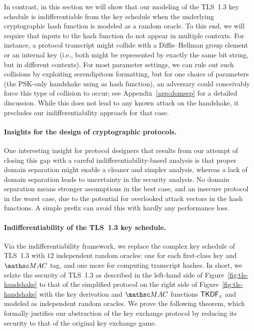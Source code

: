 In contrast, in this section we will show that our modeling of the TLS~1.3 key schedule is indifferentiable from the key schedule when the underlying cryptographic hash function is modeled as a random oracle. 
To this end, we will require that inputs to the hash function do not appear in multiple contexts. 
For instance, a protocol transcript might collide with a Diffie--Hellman group element or an internal key (i.e., both might be represented by exactly the same bit string, but in different contexts). 
For most parameter settings, we can rule out such collisions by exploiting serendipitous formatting, but for one choice of parameters (the PSK-only handshake using  as hash function), an adversary could conceivably force this type of collision to occur; see 
	Appendix~\ref{app:domsep}
for a detailed discussion.
While this does not lead to any known attack on the handshake, it precludes our indifferentiability approach for that case.

\paragraph{Insights for the design of cryptographic protocols.}
One interesting insight for protocol designers that results from our attempt of closing this gap with a careful indifferentiability-based analysis is that proper domain separation might enable a cleaner and simpler analysis, whereas a lack of domain separation leads to uncertainty in the security analysis. 
No domain separation means stronger assumptions in the best case, and an insecure protocol in the worst case, due to the potential for overlooked attack vectors in the hash functions. 
A simple prefix can avoid this with hardly any performance loss.

\paragraph{Indifferentiability of the TLS~1.3 key schedule.}
Via the indifferentiability framework, we replace the complex key schedule of TLS~1.3 with $12$ independent random oracles: one for each first-class key and $\MAC$ tag, and one more for computing transcript hashes. 
In short, we relate the security of TLS~1.3 as described in the left-hand side of Figure~\ref{fig:tls-handshake} to that of the simplified protocol on the right side of Figure~\ref{fig:tls-handshake} with the key derivation and $\MAC$ functions $\mathsf{TKDF}_x$ and modeled as independent random oracles.
We prove the following theorem, which formally justifies our abstraction of the key exchange protocol by reducing its security to that of the original key exchange game.

